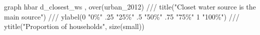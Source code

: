 graph hbar d_closest_ws , over(urban_2012) ///
        title("Closet water source is the main source") ///
        ylabel(0 "0\%" .25 "25\%" .5 "50\%" .75 "75\%" 1 "100\%") ///
        ytitle("Proportion of households", size(small))
